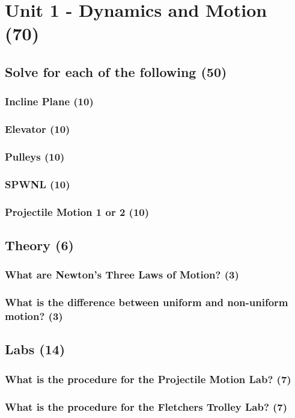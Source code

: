 \documentclass{article}
\begin{document}
\section{Unit 1 - Dynamics and Motion (70)}
\subsection{Solve for each of the following (50)}
\subsubsection{Incline Plane (10)}
\subsubsection{Elevator (10)}
\subsubsection{Pulleys (10)}
\subsubsection{SPWNL (10)}
\subsubsection{Projectile Motion 1 or 2 (10)}

\subsection{Theory (6)}
\subsubsection{What are Newton's Three Laws of Motion? (3)}
\subsubsection{What is the difference between uniform and non-uniform motion? (3)}

\subsection{Labs (14)}
\subsubsection{What is the procedure for the Projectile Motion Lab? (7)}
\subsubsection{What is the procedure for the Fletchers Trolley Lab? (7)}
\end{document}
